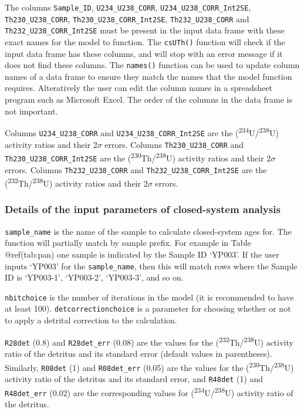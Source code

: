 \documentclass[]{elsarticle} %
\begin{document}
The columns \texttt{Sample\_ID}, \texttt{U234\_U238\_CORR}, \texttt{U234\_U238\_CORR\_Int2SE}, \texttt{Th230\_U238\_CORR}, \texttt{Th230\_U238\_CORR\_Int2SE}, \texttt{Th232\_U238\_CORR} and \texttt{Th232\_U238\_CORR\_Int2SE} must be present in the input data frame with these exact names for the model to function. The \texttt{csUTh()} function will check if the input data frame has these columns, and will stop with an error message if it does not find these columns. The \texttt{names()} function can be used to update column names of a data frame to ensure they match the names that the model function requires. Alteratively the user can edit the column names in a spreadsheet program such as Microsoft Excel. The order of the columns in the data frame is not important.

Columns \texttt{U234\_U238\_CORR} and \texttt{U234\_U238\_CORR\_Int2SE} are the (\textsuperscript{234}U/\textsuperscript{238}U) activity ratios and their 2\(\sigma\) errors. Columns \texttt{Th230\_U238\_CORR} and \texttt{Th230\_U238\_CORR\_Int2SE} are the (\textsuperscript{230}Th/\textsuperscript{238}U) activity ratios and their 2\(\sigma\) errors. Columns \texttt{Th232\_U238\_CORR} and \texttt{Th232\_U238\_CORR\_Int2SE} are the (\textsuperscript{232}Th/\textsuperscript{238}U) activity ratios and their 2\(\sigma\) errors.

\hypertarget{details-of-the-input-parameters-of-closed-system-analysis}{%
\subsubsection{Details of the input parameters of closed-system analysis}\label{details-of-the-input-parameters-of-closed-system-analysis}}

\texttt{sample\_name} is the name of the sample to calculate closed-system ages for. The function will partially match by sample prefix. For example in Table @ref(tab:pan) one sample is indicated by the Sample ID `YP003'. If the user inputs `YP003' for the \texttt{sample\_name}, then this will match rows where the Sample ID is `YP003-1', `YP003-2', `YP003-3', and so on.

\texttt{nbitchoice} is the number of iterations in the model (it is recommended to have at least 100).
\texttt{detcorrectionchoice} is a parameter for choosing whether or not to apply a detrital correction to the calculation.

\texttt{R28det} (0.8) and \texttt{R28det\_err} (0.08) are the values for the (\textsuperscript{232}Th/\textsuperscript{238}U) activity ratio of the detritus and its standard error (default values in parentheses). Similarly, \texttt{R08det} (1) and \texttt{R08det\_err} (0.05) are the values for the (\textsuperscript{230}Th/\textsuperscript{238}U) activity ratio of the detritus and its standard error, and \texttt{R48det} (1) and \texttt{R48det\_err} (0.02) are the corresponding values for (\textsuperscript{234}U/\textsuperscript{238}U) activity ratio of the detritus.
\end{document}
